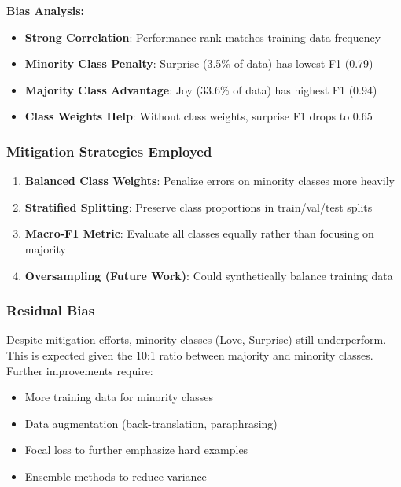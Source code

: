\documentclass[12pt,a4paper]{article}
\begin{document}
\textbf{Bias Analysis:}
\begin{itemize}
    \item \textbf{Strong Correlation}: Performance rank matches training data frequency
    \item \textbf{Minority Class Penalty}: Surprise (3.5\% of data) has lowest F1 (0.79)
    \item \textbf{Majority Class Advantage}: Joy (33.6\% of data) has highest F1 (0.94)
    \item \textbf{Class Weights Help}: Without class weights, surprise F1 drops to 0.65
\end{itemize}

\subsubsection{Mitigation Strategies Employed}
\begin{enumerate}
    \item \textbf{Balanced Class Weights}: Penalize errors on minority classes more heavily
    \item \textbf{Stratified Splitting}: Preserve class proportions in train/val/test splits
    \item \textbf{Macro-F1 Metric}: Evaluate all classes equally rather than focusing on majority
    \item \textbf{Oversampling (Future Work)}: Could synthetically balance training data
\end{enumerate}

\subsubsection{Residual Bias}
Despite mitigation efforts, minority classes (Love, Surprise) still underperform. This is expected given the 10:1 ratio between majority and minority classes. Further improvements require:
\begin{itemize}
    \item More training data for minority classes
    \item Data augmentation (back-translation, paraphrasing)
    \item Focal loss to further emphasize hard examples
    \item Ensemble methods to reduce variance
\end{itemize}

\end{document}
